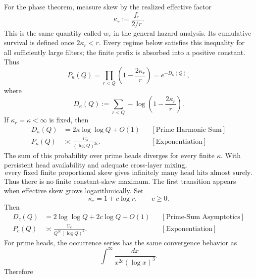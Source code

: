 For the phase theorem, measure skew by the realized effective factor
\begin{equation*}
\kappa_r
:=\frac{f_r}{2/r}.
\end{equation*}
This is the same quantity called $w_r$ in the general hazard analysis. Its cumulative survival is defined once $2\kappa_r < r$. Every regime below satisfies this inequality for all sufficiently large filters; the finite prefix is absorbed into a positive constant. Thus
\begin{equation*}
P_{\kappa}(Q)
=
\prod_{r < Q}\left(1-\frac{2\kappa_r}{r}\right)
=e^{-D_{\kappa}(Q)},
\end{equation*}
where
\begin{equation*}
D_{\kappa}(Q)
:=
\sum_{r < Q}-\log\left(1-\frac{2\kappa_r}{r}\right).
\end{equation*}
If $\kappa_r=\kappa < \infty$ is fixed, then
\begin{equation*}
\begin{aligned}
D_{\kappa}(Q)
&=2\kappa\log\log Q+O(1)
&&[\text{Prime Harmonic Sum}]\\
P_{\kappa}(Q)
&\asymp\frac{C_{\kappa}}{(\log Q)^{2\kappa}}.
&&[\text{Exponentiation}]
\end{aligned}
\end{equation*}
The sum of this probability over prime heads diverges for every finite $\kappa$. With persistent head availability and adequate cross-layer mixing,
\begin{equation*}
\text{every fixed finite proportional skew gives infinitely many head hits almost surely.}
\end{equation*}
Thus there is no finite constant-skew maximum.
The first transition appears when effective skew grows logarithmically. Set
\begin{equation*}
\kappa_r=1+c\log r,
\qquad c\ge0.
\end{equation*}
Then
\begin{equation*}
\begin{aligned}
D_c(Q)
&=2\log\log Q+2c\log Q+O(1)
&&[\text{Prime-Sum Asymptotics}]\\
P_c(Q)
&\asymp\frac{C_c}{Q^{2c}(\log Q)^2}.
&&[\text{Exponentiation}]
\end{aligned}
\end{equation*}
For prime heads, the occurrence series has the same convergence behavior as
\begin{equation*}
\int^\infty\frac{dx}{x^{2c}(\log x)^3}.
\end{equation*}
Therefore
